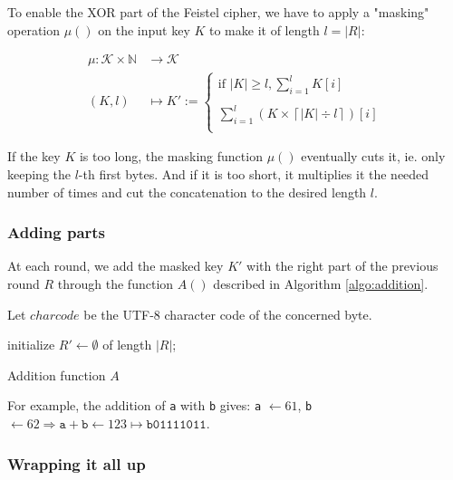 \documentclass[twoside,twocolumn]{article}
\newcommand{\ceil}[1]{\left\lceil #1 \right\rceil}
\theoremstyle{definition}
\theoremstyle{remark}
\begin{document}
To enable the XOR part of the Feistel cipher, we have to apply a "masking" operation $\mu()$ on the input key $K$ to make it of length $l = |R|$:
\begin{small}
    \begin{equation}
        \label{eq:masking}
        \begin{array}{rl}
            \mu: \mathcal{K} \times \mathbb{N} &\to \mathcal{K} \\
            (K, l) &\mapsto K' := \left\{
                \begin{array}{l}
                    \textrm{if } |K| \geq l, \sum_{i=1}^l K[i] \\ \\
                    \sum_{i=1}^l (K \times \ceil{|K| \div l})[i] \\
                \end{array}
            \right.
        \end{array}
    \end{equation}
\end{small}
If the key $K$ is too long, the masking function $\mu()$ eventually cuts it, ie. only keeping the $l$-th first bytes.
And if it is too short, it multiplies it the needed number of times and cut the concatenation to the desired length $l$.

\subsubsection{Adding parts}

At each round, we add the masked key $K'$ with the right part of the previous round $R$ through the function $A()$ described in Algorithm 
\ref{algo:addition}.

Let $charcode$ be the UTF-8 character code of the concerned byte.
\begin{algorithm}
    initialize $R' \gets \emptyset$ of length $|R|$; \\
    \caption{Addition function $A$}
    \label{algo:addition}
\end{algorithm}

For example, the addition of \texttt{a} with \texttt{b} gives:
\texttt{a} $\gets 61$,  \texttt{b} $\gets 62 \Rightarrow \texttt{a} + \texttt{b} \gets 123 \mapsto \texttt{b01111011}$.

\subsubsection{Wrapping it all up}
\end{document}
